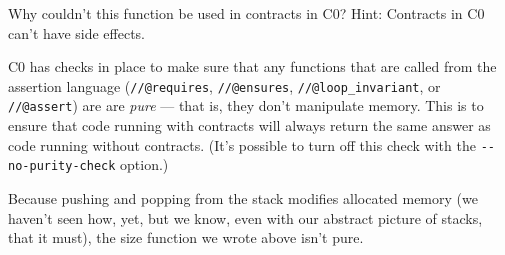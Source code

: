 
\enlargethispage{5ex}
Why couldn't this function be used in contracts in C0? Hint:
Contracts in C0 can't have side effects.

\answerline{}

\begin{solution}
C0 has checks in place to make sure that any functions that are called
from the assertion language (\lstinline'//@requires', \lstinline'//@ensures',
\lstinline'//@loop_invariant', or \lstinline'//@assert') are
are \emph{pure} --- that is, they don't manipulate memory. This
is to ensure that code running with contracts will always return the
same answer as code running without contracts. (It's possible to turn
off this check with the \lstinline'--no-purity-check' option.)

Because pushing and popping from the stack modifies allocated memory
(we haven't seen how, yet, but we know, even with our abstract picture
of stacks, that it must), the size function we wrote above isn't pure.
\end{solution}
